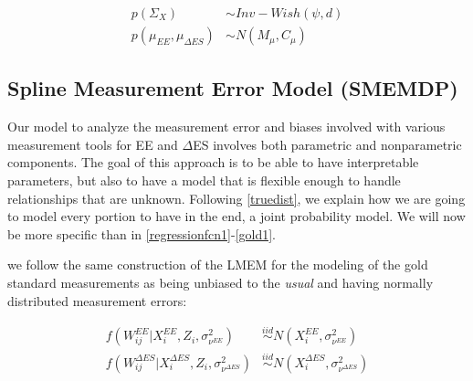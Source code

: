 \documentclass[11pt]{article}\usepackage[]{graphicx}\usepackage[]{color}
\begin{document}
\begin{align}
   p(\Sigma_X) &\sim Inv-Wish(\psi,d)\\
   p(\mu_{EE},\mu_{\Delta ES}) &\sim N(M_{\mu},C_{\mu}) 
\end{align}







\subsection{Spline Measurement Error Model (SMEMDP)}

Our model to analyze the measurement error and biases involved with various measurement tools for EE and $\Delta$ES involves both parametric and nonparametric components. The goal of this approach is to be able to have interpretable parameters, but also to have a model that is flexible enough to handle relationships  that are unknown. Following \eqref{truedist}, we explain how we are going to model every portion to have in the end, a joint probability model. We will now be more specific than in \eqref{regressionfcn1}-\eqref{gold1}.

we follow the same construction of the LMEM for the modeling of the gold standard measurements as being unbiased to the \emph{usual} and having normally distributed measurement errors:

\begin{align}
  f(W_{ij}^{EE}|X_i^{EE},Z_i,\sigma_{\nu^{EE}}^2) &\overset{iid}{\sim} N(X_i^{EE},\sigma_{\nu^{EE}}^2) \\
    f(W_{ij}^{\Delta ES}|X_i^{\Delta ES},Z_i,\sigma_{\nu^{\Delta ES}}^2) &\overset{iid}{\sim} N(X_i^{\Delta ES},\sigma_{\nu^{\Delta ES}}^2) \\
\end{align}
\end{document}
